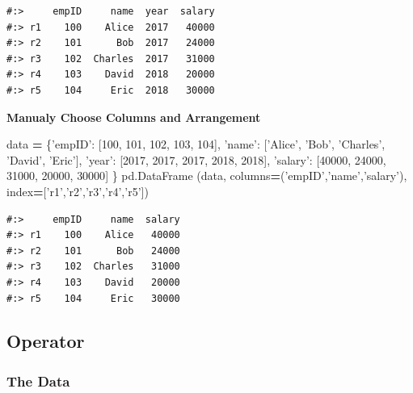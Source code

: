 \documentclass[
]{book}
\newenvironment{Shaded}{\begin{snugshade}}{\end{snugshade}}
\newcommand{\DecValTok}[1]{\textcolor[rgb]{0.06,0.06,0.06}{#1}}
\newcommand{\NormalTok}[1]{#1}
\newcommand{\OperatorTok}[1]{\textcolor[rgb]{0.43,0.43,0.43}{\textbf{#1}}}
\newcommand{\StringTok}[1]{\textcolor[rgb]{0.5,0.5,0.5}{#1}}
\begin{document}
\begin{verbatim}
#:>     empID     name  year  salary
#:> r1    100    Alice  2017   40000
#:> r2    101      Bob  2017   24000
#:> r3    102  Charles  2017   31000
#:> r4    103    David  2018   20000
#:> r5    104     Eric  2018   30000
\end{verbatim}

\textbf{Manualy Choose Columns and Arrangement}

\begin{Shaded}
\begin{Highlighting}[]
\NormalTok{data }\OperatorTok{=}\NormalTok{ \{}\StringTok{'empID'}\NormalTok{:  [}\DecValTok{100}\NormalTok{,      }\DecValTok{101}\NormalTok{,    }\DecValTok{102}\NormalTok{,      }\DecValTok{103}\NormalTok{,     }\DecValTok{104}\NormalTok{],}
        \StringTok{'name'}\NormalTok{:   [}\StringTok{'Alice'}\NormalTok{, }\StringTok{'Bob'}\NormalTok{,  }\StringTok{'Charles'}\NormalTok{, }\StringTok{'David'}\NormalTok{, }\StringTok{'Eric'}\NormalTok{],}
        \StringTok{'year'}\NormalTok{:   [}\DecValTok{2017}\NormalTok{,     }\DecValTok{2017}\NormalTok{,   }\DecValTok{2017}\NormalTok{,      }\DecValTok{2018}\NormalTok{,    }\DecValTok{2018}\NormalTok{],}
        \StringTok{'salary'}\NormalTok{: [}\DecValTok{40000}\NormalTok{,    }\DecValTok{24000}\NormalTok{,  }\DecValTok{31000}\NormalTok{,     }\DecValTok{20000}\NormalTok{,   }\DecValTok{30000}\NormalTok{] \}}
\NormalTok{pd.DataFrame (data, columns}\OperatorTok{=}\NormalTok{(}\StringTok{'empID'}\NormalTok{,}\StringTok{'name'}\NormalTok{,}\StringTok{'salary'}\NormalTok{), index}\OperatorTok{=}\NormalTok{[}\StringTok{'r1'}\NormalTok{,}\StringTok{'r2'}\NormalTok{,}\StringTok{'r3'}\NormalTok{,}\StringTok{'r4'}\NormalTok{,}\StringTok{'r5'}\NormalTok{])}
\end{Highlighting}
\end{Shaded}

\begin{verbatim}
#:>     empID     name  salary
#:> r1    100    Alice   40000
#:> r2    101      Bob   24000
#:> r3    102  Charles   31000
#:> r4    103    David   20000
#:> r5    104     Eric   30000
\end{verbatim}

\hypertarget{operator-2}{%
\subsection{Operator}\label{operator-2}}

\hypertarget{the-data-1}{%
\subsubsection{The Data}\label{the-data-1}}
\end{document}
